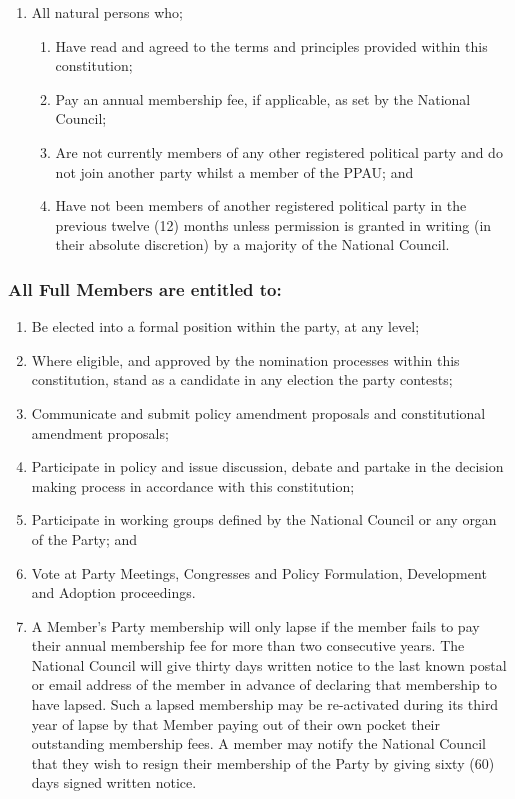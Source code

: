\documentclass[a4paper,titlepage,8.5pt]{article}
\begin{document}
\begin{enumerate}
\item All natural persons who;
\begin{enumerate}
\item Have read and agreed to the terms and principles provided within this constitution;
\item Pay an annual membership fee, if applicable, as set by the National Council;
\item Are not currently members of any other registered political party and do not join another party whilst a member of the PPAU; and
\item Have not been members of another registered political party in the previous twelve (12) months unless permission is granted in writing (in their absolute discretion) by a majority of the National Council.
\end{enumerate}
\end{enumerate}

\subsubsection{All Full Members are entitled to:}

\begin{enumerate}
\item Be elected into a formal position within the party, at any level;
\item Where eligible, and approved by the nomination processes within this constitution, stand as a candidate in any election the party contests;
\item Communicate and submit policy amendment proposals and constitutional amendment proposals;
\item Participate in policy and issue discussion, debate and partake in the decision making process in accordance with this constitution;
\item Participate in working groups defined by the National Council or any organ of the Party; and
\item Vote at Party Meetings, Congresses and Policy Formulation, Development and Adoption proceedings.
\item A Member's Party membership will only lapse if the member fails to pay their annual membership fee for more than two consecutive years. The National Council will give thirty days written notice to the last known postal or email address of the member in advance of declaring that membership to have lapsed. Such a lapsed membership may be re-activated during its third year of lapse by that Member paying out of their own pocket their outstanding membership fees. A member may notify the National Council that they wish to resign their membership of the Party by giving sixty (60) days
signed written notice.
\end{enumerate}
\end{document}

